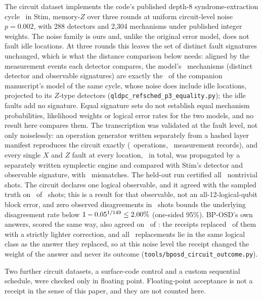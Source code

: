 \documentclass[aps,pra,twocolumn,superscriptaddress,nofootinbib,longbibliography,floatfix]{revtex4-2}
\begin{document}
The circuit dataset implements the code's published depth-8 syndrome-extraction cycle~\cite{bravyi2024high} in Stim, memory-$Z$ over three rounds at uniform circuit-level noise $p=0.002$, with 288 detectors and 2{,}304 mechanisms under published integer weights. The noise family is ours and, unlike the original error model, does not fault idle locations. At three rounds this leaves the set of distinct fault signatures unchanged, which is what the distance comparison below needs: aligned by the measurement events each detector compares, the model's \EqMechanisms\ mechanisms (distinct detector and observable signatures) are exactly the \EqMechanismsPthree\ of the companion manuscript's model of the same cycle, whose noise does include idle locations, projected to its $Z$-type detectors (\texttt{qldpc\_refsched\_p3\_equality.py}); the idle faults add no signature. Equal signature sets do not establish equal mechanism probabilities, likelihood weights or logical error rates for the two models, and no result here compares them. The transcription was validated at the fault level, not only noiselessly: an operation generator written separately from a hashed layer manifest reproduces the circuit exactly (\XvalOps\ operations, \XvalRecords\ measurement records), and every single $X$ and $Z$ fault at every location, \XvalFaults\ in total, was propagated by a separately written symplectic engine and compared with Stim's detector and observable signature, with \XvalMismatches\ mismatches. The held-out run certified all \HoRefschedNontrivial\ nontrivial shots. The circuit declares one logical observable, and it agreed with the sampled truth on \HoRefschedObsAgree\ of \HoRefschedNontrivial\ shots; this is a result for that observable, not an all-12-logical-qubit block error, and zero observed disagreements in \HoRefschedNontrivial\ shots bounds the underlying disagreement rate below $1-0.05^{1/149}\le2.00\%$ (one-sided 95\%). BP-OSD's own answers, scored the same way, also agreed on \HoRefschedBposdObsAgree\ of \HoRefschedNontrivial: the receipts replaced \HoRefschedReplaced\ of them with a strictly lighter correction, and all \HoRefschedReplacedSameObs\ replacements lie in the same logical class as the answer they replaced, so at this noise level the receipt changed the weight of the answer and never its outcome (\texttt{tools/bposd\_circuit\_outcome.py}).

Two further circuit datasets, a surface-code control and a custom sequential schedule, were checked only in floating point. Floating-point acceptance is not a receipt in the sense of this paper, and they are not counted here.
\end{document}
